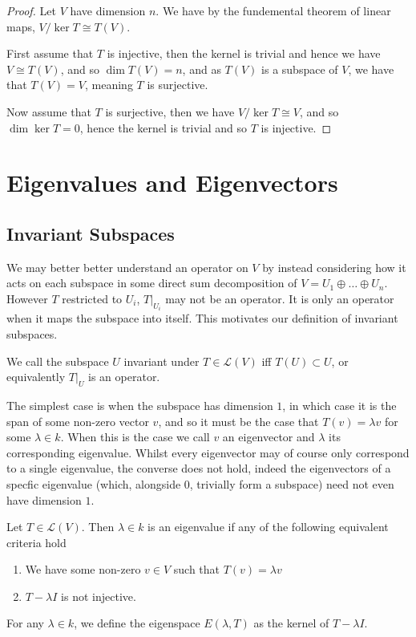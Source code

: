 \documentclass[]{article}
\begin{document}
\begin{proof}
		Let $V$ have dimension $n$. We have by the fundemental theorem of linear maps, $V / \ker T \cong T(V)$. 

		First assume that $T$ is injective, then the kernel is trivial and hence we have $V \cong T(V)$, and so $\dim T(V) = n$, and as $T(V)$ is a subspace of $V$, we have that $T(V) = V$, meaning $T$ is surjective. 

		Now assume that $T$ is surjective, then we have $V / \ker T \cong V$, and so $\dim \ker T = 0$, hence the kernel is trivial and so $T$ is injective.
\end{proof}

\section{Eigenvalues and Eigenvectors}

\subsection{Invariant Subspaces}

We may better better understand an operator on $V$ by instead considering how it acts on each subspace in some direct sum decomposition of $V = U_1 \oplus \ldots \oplus U_n$. However $T$ restricted to $U_i$, $T|_{U_i}$ may not be an operator. It is only an operator when it maps the subspace into itself. This motivates our definition of invariant subspaces.

\begin{defi} 
		We call the subspace $U$ invariant under $T \in \mathcal{L}(V)$ iff $T(U) \subset U$, or equivalently $T|_U$ is an operator.
\end{defi}

The simplest case is when the subspace has dimension $1$, in which case it is the span of some non-zero vector $v$, and so it must be the case that $T(v) = \lambda v$ for some $\lambda \in k$. When this is the case we call $v$ an eigenvector and $\lambda$ its corresponding eigenvalue. Whilst every eigenvector may of course only correspond to a single eigenvalue, the converse does not hold, indeed the eigenvectors of a specfic eigenvalue (which, alongside $0$, trivially form a subspace) need not even have dimension $1$.

\begin{defi}
		Let $T \in \mathcal{L}(V)$. Then $\lambda \in k$ is an eigenvalue if any of the following equivalent criteria hold
		\begin{enumerate}
				\item We have some non-zero $v \in V$ such that $T(v) = \lambda v$ 
				\item $T - \lambda I$ is not injective.
		\end{enumerate}

		For any $\lambda \in k$, we define the eigenspace $E(\lambda, T)$ as the kernel of $T - \lambda I$. 
\end{defi}
\end{document}
